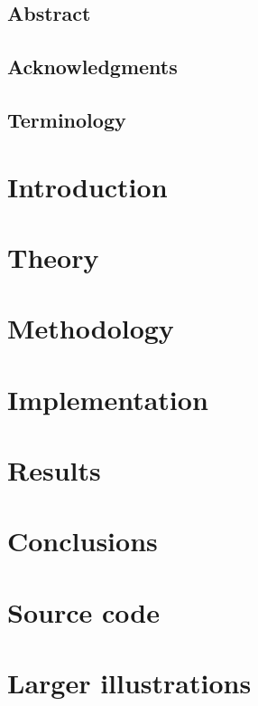 \documentclass{report}
\begin{document}
\pagestyle{fancy}
\fancyhead{}
\fancyhead[R]{\today}
\fancyfoot[C]{\thepage}

\section*{\hspace*{35pt}\Huge{Abstract}}
    

\newpage

\section*{\hspace*{35pt}\Huge{Acknowledgments}}
    
\newpage
{
\sffamily\tableofcontents
}
\newpage
\section*{\hspace*{35pt}\Huge{Terminology}}


\newpage
{}
\chapter{Introduction}
    
    \newpage
\chapter{Theory}
    
    \newpage
\chapter{Methodology}
    
    \newpage
\chapter{Implementation}
    
    \newpage
\chapter{Results}
    
    \newpage
\chapter{Conclusions}
    


\newpage
\renewcommand{\bibname}{References}
 


\appendix
\begin{appendices}
  \chapter{Source code}
  
  \chapter{Larger illustrations}
  
\end{appendices}
\end{document}
